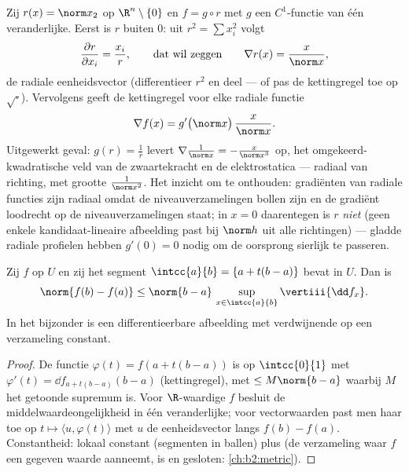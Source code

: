 \begin{example}\label{ex:b2:diffcalc:radial}
Zij $r(x) = \norm x_2$ op $\R^n\setminus\{0\}$ en $f = g \circ r$
met $g$ een $C^1$-functie van één veranderlijke. Eerst is $r$
 buiten $0$: uit $r^2 = \sum x_i^2$ volgt
\[
\frac{\partial r}{\partial x_i} = \frac{x_i}{r},
\qquad\text{dat wil zeggen}\qquad
\nabla r(x) = \frac{x}{\norm x} ,
\]
de radiale eenheidsvector (differentieer $r^2$ en deel --- of pas
de kettingregel toe op $\sqrt{\cdot}$). Vervolgens geeft de
kettingregel voor elke radiale functie
\[
\nabla f(x) = g'\bigl(\norm x\bigr)\,\frac{x}{\norm x} .
\]
Uitgewerkt geval: $g(r) = \frac1r$ levert $\nabla\frac{1}{\norm x}
= -\frac{x}{\norm x^3}$ op, het omgekeerd-kwadratische veld van
de zwaartekracht en de elektrostatica --- radiaal van richting,
met grootte $\frac{1}{\norm x^2}$. Het inzicht om te onthouden:
gradiënten van radiale functies zijn radiaal omdat de
niveauverzamelingen bollen zijn en de gradiënt loodrecht op de
niveauverzamelingen staat; in $x = 0$ daarentegen is $r$
\emph{niet}  (geen enkele kandidaat-lineaire
afbeelding past bij $\norm h$ uit alle richtingen) --- gladde
radiale profielen hebben $g'(0) = 0$ nodig om de oorsprong
sierlijk te passeren.
\end{example}

\begin{theorem}[Middelwaardeongelijkheid]\label{thm:b2:diffcalc:mvi}
Zij $f$  op $U$ en zij het segment $\intcc{a}{b}
= \{a + t(b-a)\}$ bevat in $U$. Dan is
\[
\norm{f(b) - f(a)} \leq \norm{b - a}\,
\sup_{x \in \intcc{a}{b}} \vertiii{\dd f_x} .
\]
In het bijzonder is een differentieerbare afbeelding met
verdwijnende  op een \emph{} 
verzameling constant.
\end{theorem}

\begin{proof}
De functie $\varphi(t) = f(a + t(b-a))$ is  op
$\intcc{0}{1}$ met $\varphi'(t) = \dd f_{a + t(b-a)}(b - a)$
(kettingregel), met  $\leq M\norm{b-a}$ waarbij $M$ het
getoonde supremum is. Voor $\R$-waardige $f$ besluit de
middelwaardeongelijkheid in één veranderlijke; voor vectorwaarden
past men haar toe op $t \mapsto \langle u, \varphi(t)\rangle$ met
$u$ de eenheidsvector langs $f(b) - f(a)$. Constantheid: lokaal
constant (segmenten in ballen) plus  (de verzameling
waar $f$ een gegeven waarde aanneemt, is  en gesloten:
\cref{ch:b2:metric}).
\end{proof}

